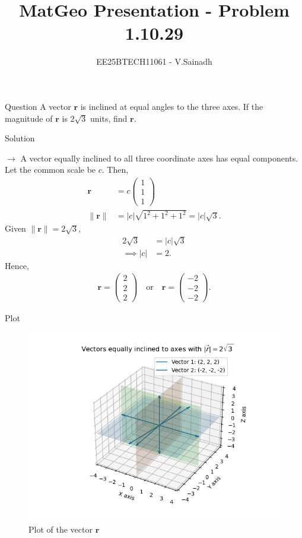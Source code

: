\documentclass{beamer}
\title{MatGeo Presentation - Problem 1.10.29}
\author{EE25BTECH11061 - V.Sainadh}
\date{}
\numberwithin{equation}{section}
\theoremstyle{remark}
\providecommand{\norm}[1]{\lVert#1\rVert}
\newcommand{\myvec}[1]{\ensuremath{\begin{pmatrix}#1\end{pmatrix}}}
\let\vec\mathbf
\begin{document}
\frame{\titlepage}
\begin{frame}{Question}
A vector $\vec{r}$ is inclined at equal angles to the three axes. If the magnitude of $\vec{r}$ is $2\sqrt{3}$ units, find $\vec{r}$.

\end{frame}

\begin{frame}{Solution}

$\rightarrow$ A vector equally inclined to all three coordinate axes has equal components. Let the common scale be $c$. Then,
\begin{align}
	\vec{r} &= c\myvec{1\\1\\1} \\
	\norm{\vec{r}} &= |c|\sqrt{1^2+1^2+1^2} = |c|\sqrt{3}.
\end{align}
Given $\norm{\vec{r}} = 2\sqrt{3}$,
\begin{align}
	2\sqrt{3} &= |c|\sqrt{3} \\
	\implies |c| &= 2.
\end{align}
Hence,
\begin{align}
	\vec{r} = \myvec{2\\2\\2}\quad \text{or}\quad \vec{r}=\myvec{-2\\-2\\-2}.
\end{align}

\end{frame}

\begin{frame}{Plot}
\begin{figure}[h!]
   \centering
   \includegraphics[width=0.8\linewidth]{figs/Figure_1.png}
   \caption{Plot of the vector $\vec{r}$}
   \label{Plot_1}
\end{figure}
\end{frame}
\end{document}
